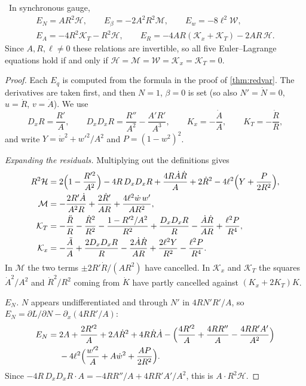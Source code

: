 \begin{theorem}\label{thm:redEL}\ver\
In synchronous gauge,
\[
\begin{gathered}E_N=AR^2\mathcal H,\qquad E_\beta=-2A^2R^2\mathcal M,\qquad E_w=-8\ell^2\mathcal W,\\ E_A=-4R^2\mathcal K_T-R^2\mathcal H,\qquad E_R=-4AR(\mathcal K_x+\mathcal K_T)-2AR\,\mathcal H .\end{gathered}
\]
Since $A,R,\ell\ne0$ these relations are invertible, so all five Euler--Lagrange equations hold if and only if $\mathcal H=\mathcal M=\mathcal W=\mathcal K_x=\mathcal K_T=0$.
\end{theorem}
\begin{proof}
Each $E_q$ is computed from the formula in the proof of \cref{thm:redvar}. The derivatives are taken first, and then $N=1$, $\beta=0$ is set (so also $N'=\dot N=0$, $u=\dot R$, $v=\dot A$). We use
\[
D_xR=\frac{R'}A,\qquad D_xD_xR=\frac{R''}{A^2}-\frac{A'R'}{A^3},\qquad K_x=-\frac{\dot A}A,\qquad K_T=-\frac{\dot R}R ,
\]
and write $Y=\dot w^2+w'^2/A^2$ and $P=(1-w^2)^2$.

\emph{Expanding the residuals.} Multiplying out the definitions gives
\begin{align*}
R^2\mathcal H&=2\Bigl(1-\frac{R'^2}{A^2}\Bigr)-4R\,D_xD_xR+\frac{4R\dot A\dot R}A+2\dot R^2-4\ell^2\Bigl(Y+\frac P{2R^2}\Bigr),\\
\mathcal M&=-\frac{2R'\dot A}{A^2R}+\frac{2\dot R'}{AR}+\frac{4\ell^2\dot w\,w'}{AR^2},\\
\mathcal K_T&=-\frac{\ddot R}R-\frac{\dot R^2}{R^2}-\frac{1-R'^2/A^2}{R^2}+\frac{D_xD_xR}R-\frac{\dot A\dot R}{AR}+\frac{\ell^2P}{R^4},\\
\mathcal K_x&=-\frac{\ddot A}A+\frac{2D_xD_xR}R-\frac{2\dot A\dot R}{AR}+\frac{2\ell^2Y}{R^2}-\frac{\ell^2P}{R^4}.
\end{align*}
In $\mathcal M$ the two terms $\pm2R'\dot R/(AR^2)$ have cancelled. In $\mathcal K_x$ and $\mathcal K_T$ the squares $\dot A^2/A^2$ and $\dot R^2/R^2$ coming from $\dot K$ have partly cancelled against $(K_x+2K_T)K$.

\emph{$E_N$.} $N$ appears undifferentiated and through $N'$ in $4RN'R'/A$, so $E_N=\partial L/\partial N-\partial_x(4RR'/A)$:
\[
\begin{aligned}
E_N={}&2A+\frac{2R'^2}A+2A\dot R^2+4R\dot R\dot A-\Bigl(\frac{4R'^2}A+\frac{4RR''}A-\frac{4RR'A'}{A^2}\Bigr)\\
&-4\ell^2\Bigl(\frac{w'^2}A+A\dot w^2+\frac{AP}{2R^2}\Bigr).
\end{aligned}
\]
Since $-4R\,D_xD_xR\cdot A=-4RR''/A+4RR'A'/A^2$, this is $A\cdot R^2\mathcal H$.


\end{proof}
